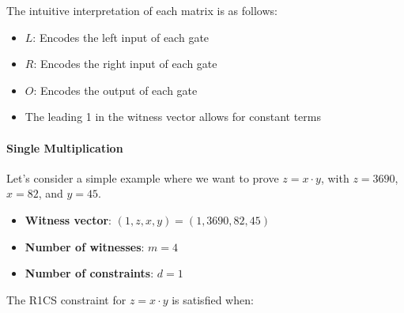 \documentclass{article}
\begin{document}
The intuitive interpretation of each matrix is as follows:

\begin{itemize}
\item $L$: Encodes the left input of each gate
\item $R$: Encodes the right input of each gate
\item $O$: Encodes the output of each gate
\item The leading 1 in the witness vector allows for constant terms
\end{itemize}

\paragraph{Single Multiplication}

Let's consider a simple example where we want to prove $z = x \cdot y$, with $z = 3690$, $x = 82$, and $y = 45$.

\begin{itemize}
    \item \textbf{Witness vector}: $(1, z, x, y) = (1, 3690, 82, 45)$
    \item \textbf{Number of witnesses}: $m = 4$
    \item \textbf{Number of constraints}: $d = 1$
\end{itemize}

The R1CS constraint for $z = x \cdot y$ is satisfied when:
\end{document}
